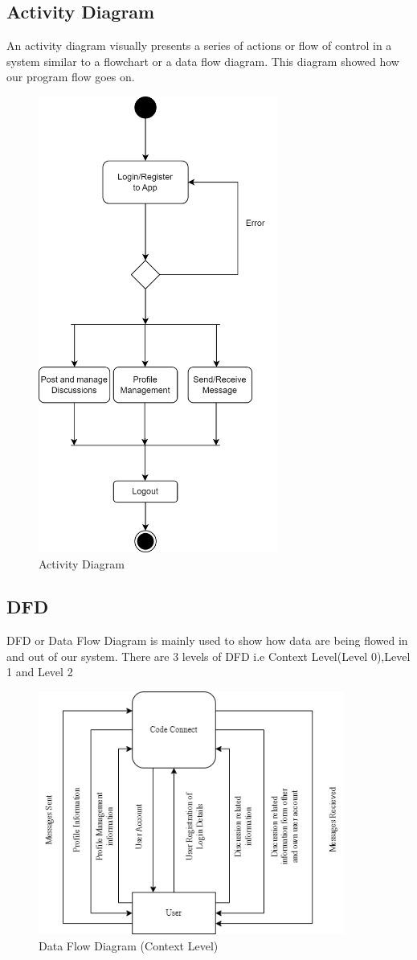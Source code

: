 \subsection{Activity Diagram}
An activity diagram visually presents a series of actions or flow of control in a system similar to a flowchart or a data flow diagram. This diagram showed how our program flow goes on.
\begin{figure}[H]
   \centering
    \includegraphics[height = 15cm]{Diagrams/Activity.drawio.png}
    \caption{Activity Diagram}
\end{figure}
\newpage
\subsection{DFD}
DFD or Data Flow Diagram is mainly used to show how data are being flowed in and out of our system. There are 3 levels of DFD i.e Context Level(Level 0),Level 1 and Level 2
\begin{figure}[H]
    \centering
    \includegraphics[height = 8cm]{Diagrams/DFD.drawio.png}
    \caption{Data Flow Diagram (Context Level)}
\end{figure}
\newpage
